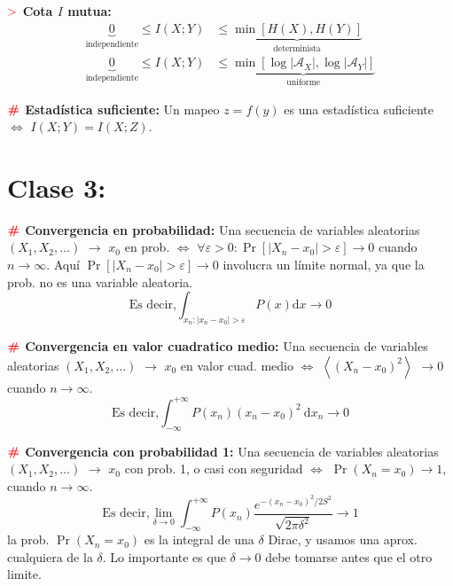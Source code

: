 \documentclass[%
 reprint,
 amsmath,amssymb,
 aps,
]{revtex4-1}
\begin{document}
\textbf{$\textcolor{red}{\mathbf{>}}$ Cota $I$ mutua:} 
$$
\begin{aligned}
  \underbrace{0}_\text{independiente} \leq I(X ; Y) & \leq \underbrace{\min [H(X), H(Y)]}_\text{determinista} \\
  \underbrace{0}_\text{independiente} \leq I(X ; Y) & \leq \underbrace{\min \left[\log \left| \mathcal{A}_{X} \right|, \log \left|\mathcal{A}_{Y}\right| \right]}_\text{uniforme}
\end{aligned}
$$

\textbf{$\color{red}{\textbf{\#}}$ Estadística suficiente:} 
Un mapeo $z=f(y)$ es una estadística suficiente $\Leftrightarrow$ $I(X ; Y)=I(X ; Z)$.

\section{Clase 3:}

\textbf{$\color{red}{\textbf{\#}}$ Convergencia en probabilidad:} 
Una secuencia de variables aleatorias $\left(X_{1}, X_{2}, \ldots\right)$ $\rightarrow$ $x_{0}$ en prob. $\Leftrightarrow$ $\forall \varepsilon>0: \operatorname{Pr}\left[\left|X_{n}-x_{0}\right|>\varepsilon\right] \rightarrow 0$ cuando $n \rightarrow \infty .$ Aquí $\operatorname{Pr}\left[\left|X_{n}-x_{0}\right|>\varepsilon\right] \rightarrow 0$ involucra un límite normal, ya que la prob. no es una variable aleatoria. 
$$\text{Es decir,}
\int_{x_{n} :\left|x_{n}-x_{0}\right|>\varepsilon} P(x) \mathrm{d} x \rightarrow 0
$$

\textbf{$\color{red}{\textbf{\#}}$ Convergencia en valor cuadratico medio:}
Una secuencia de variables aleatorias $\left(X_{1}, X_{2}, \ldots\right)$ $\rightarrow$ $x_{0}$ en valor cuad. medio $\Leftrightarrow$ $\left\langle\left(X_{n}-x_{0}\right)^{2}\right\rangle$ $\rightarrow 0$ cuando $n \rightarrow \infty .$ 
$$ \text{Es decir,}
\int_{-\infty}^{+\infty} P\left(x_{n}\right)\left(x_{n}-x_{0}\right)^{2} \mathrm{~d} x_{n} \rightarrow 0
$$

\textbf{$\color{red}{\textbf{\#}}$ Convergencia con probabilidad 1:}
Una secuencia de variables aleatorias $\left(X_{1}, X_{2}, \ldots\right)$ $\rightarrow$  $x_{0}$ con prob. 1, o casi con seguridad $\Leftrightarrow$  $\operatorname{Pr}\left(X_{n}=x_{0}\right) \rightarrow 1,$ cuando $n \rightarrow \infty$. 
$$ \text{Es decir,}
\lim _{\delta \rightarrow 0} \int_{-\infty}^{+\infty} P\left(x_{n}\right) \frac{e^{-\left(x_{n}-x_{0}\right)^{2} / 2 S^{2}}}{\sqrt{2 \pi \delta^{2}}} \rightarrow 1
$$
la prob. $\operatorname{Pr}\left(X_{n}=x_{0}\right)$ es la integral de una $\delta$ Dirac, y usamos una
aprox. cualquiera de la $\delta$. Lo importante es que $\delta \rightarrow 0$ debe tomarse antes que el otro limite. 
\end{document}
